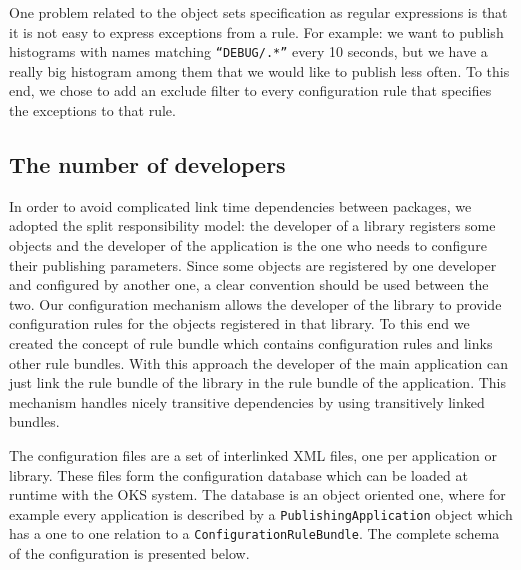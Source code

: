 One problem related to the object sets specification as regular expressions is that it is not easy to express exceptions from a rule. For example: we want to publish histograms with names matching {\tt “DEBUG/.*”} every 10 seconds, but we have a really big histogram among them that we would like to publish less often. To this end, we chose to add an exclude filter to every configuration rule that specifies the exceptions to that rule.

\subsection*{The number of developers}

In order to avoid complicated link time dependencies between packages, we adopted the split responsibility model: the developer of a library registers some objects and the developer of the application is the one who needs to configure their publishing parameters. Since some objects are registered by one developer and configured by another one, a clear convention should be used between the two. 
Our configuration mechanism allows the developer of the library to provide configuration rules for the objects registered in that library. To this end we created the concept of rule bundle which contains configuration rules and links other rule bundles. With this approach the developer of the main application can just link the rule bundle of the library in the rule bundle of the application. This mechanism handles nicely transitive dependencies by using transitively linked bundles.

The configuration files are a set of interlinked XML files, one per application or library. These files form the configuration database which can be loaded at runtime with the OKS system. The database is an object oriented one, where for example every application is described by a {\tt PublishingApplication} object which has a one to one relation to a {\tt ConfigurationRuleBundle}. The complete schema of the configuration is presented below. 

